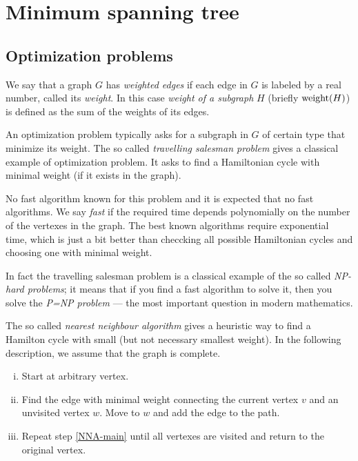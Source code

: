 \chapter{Minimum spanning tree}


\section*{Optimization problems}

We say that a graph $G$ has \emph{weighted edges} if each edge in $G$ is labeled by a real number, called its \emph{weight}.
In this case \emph{weight of a subgraph} $H$ (briefly $\mathop{\rm weight}\nolimits(H)$) is defined as the sum of the weights of its edges.

An optimization problem typically asks for a subgraph in $G$ of certain type that minimize its weight.
The so called \emph{travelling salesman problem} gives a classical example of optimization problem.
It asks to find a Hamiltonian cycle with minimal weight (if it exists in the graph).

No fast algorithm known for this problem and it is expected that no fast algorithms.
We say {}\emph{fast} if the required time depends polynomially on the number of the vertexes in the graph.
The best known algorithms require exponential time, which is just a bit better than checcking all possible Hamiltonian cycles and choosing one with minimal weight.

In fact the travelling salesman problem is a classical example of the so called {}\emph{NP-hard problems}; it means that if you find a fast algorithm to solve it, then you solve the \emph{P=NP problem} --- the most important question in modern mathematics.

The so called \emph{nearest neighbour algorithm} gives a heuristic way to find a Hamilton cycle with small (but not necessary smallest weight).
In the following description, we assume that the graph is complete.
\begin{enumerate}[(i)]
\item Start at arbitrary vertex.
\item\label{NNA-main} Find the edge with minimal weight connecting the current vertex $v$ and an unvisited vertex $w$. Move to $w$ and add the edge to the path.
\item Repeat step \ref{NNA-main} until all vertexes are visited and return to the original vertex.
\end{enumerate}

